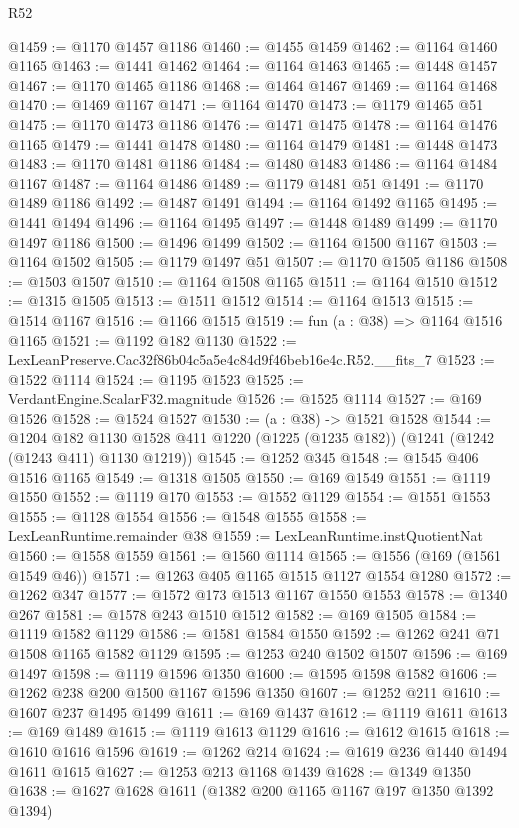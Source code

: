 \begin{lexlean}{R52}
\begin{coremodule}
@1459 := @1170 @1457 @1186
@1460 := @1455 @1459
@1462 := @1164 @1460 @1165
@1463 := @1441 @1462
@1464 := @1164 @1463
@1465 := @1448 @1457
@1467 := @1170 @1465 @1186
@1468 := @1464 @1467
@1469 := @1164 @1468
@1470 := @1469 @1167
@1471 := @1164 @1470
@1473 := @1179 @1465 @51
@1475 := @1170 @1473 @1186
@1476 := @1471 @1475
@1478 := @1164 @1476 @1165
@1479 := @1441 @1478
@1480 := @1164 @1479
@1481 := @1448 @1473
@1483 := @1170 @1481 @1186
@1484 := @1480 @1483
@1486 := @1164 @1484 @1167
@1487 := @1164 @1486
@1489 := @1179 @1481 @51
@1491 := @1170 @1489 @1186
@1492 := @1487 @1491
@1494 := @1164 @1492 @1165
@1495 := @1441 @1494
@1496 := @1164 @1495
@1497 := @1448 @1489
@1499 := @1170 @1497 @1186
@1500 := @1496 @1499
@1502 := @1164 @1500 @1167
@1503 := @1164 @1502
@1505 := @1179 @1497 @51
@1507 := @1170 @1505 @1186
@1508 := @1503 @1507
@1510 := @1164 @1508 @1165
@1511 := @1164 @1510
@1512 := @1315 @1505
@1513 := @1511 @1512
@1514 := @1164 @1513
@1515 := @1514 @1167
@1516 := @1166 @1515
@1519 := fun (a : @38) => @1164 @1516 @1165
@1521 := @1192 @182 @1130
@1522 := LexLeanPreserve.Cac32f86b04c5a5e4c84d9f46beb16e4c.R52.__fits_7
@1523 := @1522 @1114
@1524 := @1195 @1523
@1525 := VerdantEngine.ScalarF32.magnitude
@1526 := @1525 @1114
@1527 := @169 @1526
@1528 := @1524 @1527
@1530 := (a : @38) -> @1521 @1528
@1544 := @1204
    @182
    @1130
    @1528
    @411
    @1220
    (@1225 (@1235 @182))
    (@1241 (@1242 (@1243 @411) @1130 @1219))
@1545 := @1252 @345
@1548 := @1545 @406 @1516 @1165
@1549 := @1318 @1505
@1550 := @169 @1549
@1551 := @1119 @1550
@1552 := @1119 @170
@1553 := @1552 @1129
@1554 := @1551 @1553
@1555 := @1128 @1554
@1556 := @1548 @1555
@1558 := LexLeanRuntime.remainder @38
@1559 := LexLeanRuntime.instQuotientNat
@1560 := @1558 @1559
@1561 := @1560 @1114
@1565 := @1556 (@169 (@1561 @1549 @46))
@1571 := @1263 @405 @1165 @1515 @1127 @1554 @1280
@1572 := @1262 @347
@1577 := @1572 @173 @1513 @1167 @1550 @1553
@1578 := @1340 @267
@1581 := @1578 @243 @1510 @1512
@1582 := @169 @1505
@1584 := @1119 @1582 @1129
@1586 := @1581 @1584 @1550
@1592 := @1262 @241 @71 @1508 @1165 @1582 @1129
@1595 := @1253 @240 @1502 @1507
@1596 := @169 @1497
@1598 := @1119 @1596 @1350
@1600 := @1595 @1598 @1582
@1606 := @1262 @238 @200 @1500 @1167 @1596 @1350
@1607 := @1252 @211
@1610 := @1607 @237 @1495 @1499
@1611 := @169 @1437
@1612 := @1119 @1611
@1613 := @169 @1489
@1615 := @1119 @1613 @1129
@1616 := @1612 @1615
@1618 := @1610 @1616 @1596
@1619 := @1262 @214
@1624 := @1619 @236 @1440 @1494 @1611 @1615
@1627 := @1253 @213 @1168 @1439
@1628 := @1349 @1350
@1638 := @1627 @1628 @1611 (@1382 @200 @1165 @1167 @197 @1350 @1392 @1394)

\end{coremodule}
\end{lexlean}
